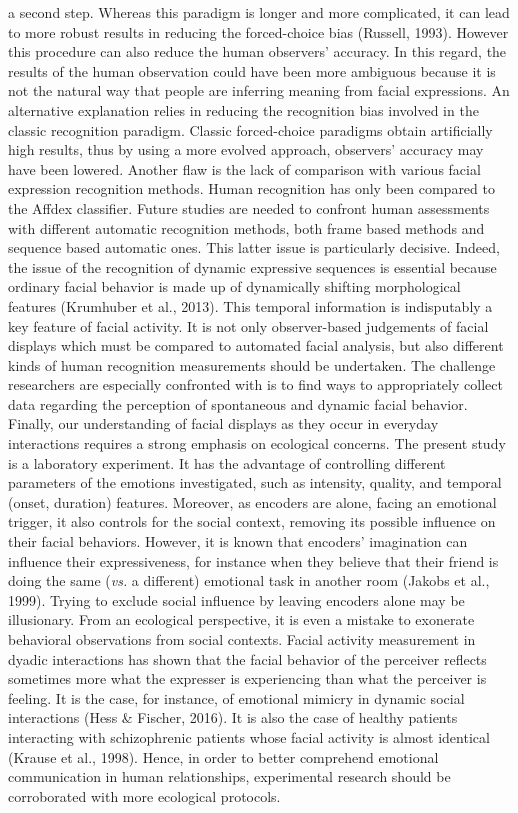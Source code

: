 \documentclass[
  english,
  doc]{apa7}
\begin{document}
a second step. Whereas this paradigm is longer and more complicated, it can lead to more robust results in reducing the forced-choice bias (Russell, 1993). However this procedure can also reduce the human observers' accuracy. In this regard, the results of the human observation could have been more ambiguous because it is not the natural way that people are inferring meaning from facial expressions. An alternative explanation relies in reducing the recognition bias involved in the classic recognition paradigm. Classic forced-choice paradigms obtain artificially high results, thus by using a more evolved approach, observers' accuracy may have been lowered. Another flaw is the lack of comparison with various facial expression recognition methods. Human recognition has only been compared to the Affdex classifier. Future studies are needed to confront human assessments with different automatic recognition methods, both frame based methods and sequence based automatic ones. This latter issue is particularly decisive. Indeed, the issue of the recognition of dynamic expressive sequences is essential because ordinary facial behavior is made up of dynamically shifting morphological features (Krumhuber et al., 2013). This temporal information is indisputably a key feature of facial activity. It is not only observer-based judgements of facial displays which must be compared to automated facial analysis, but also different kinds of human recognition measurements should be undertaken. The challenge researchers are especially confronted with is to find ways to appropriately collect data regarding the perception of spontaneous and dynamic facial behavior. Finally, our understanding of facial displays as they occur in everyday interactions requires a strong emphasis on ecological concerns. The present study is a laboratory experiment. It has the advantage of controlling different parameters of the emotions investigated, such as intensity, quality, and temporal (onset, duration) features. Moreover, as encoders are alone, facing an emotional trigger, it also controls for the social context, removing its possible influence on their facial behaviors. However, it is known that encoders' imagination can influence their expressiveness, for instance when they believe that their friend is doing the same (\emph{vs.} a different) emotional task in another room (Jakobs et al., 1999). Trying to exclude social influence by leaving encoders alone may be illusionary. From an ecological perspective, it is even a mistake to exonerate behavioral observations from social contexts. Facial activity measurement in dyadic interactions has shown that the facial behavior of the perceiver reflects sometimes more what the expresser is experiencing than what the perceiver is feeling. It is the case, for instance, of emotional mimicry in dynamic social interactions (Hess \& Fischer, 2016). It is also the case of healthy patients interacting with schizophrenic patients whose facial activity is almost identical (Krause et al., 1998). Hence, in order to better comprehend emotional communication in human relationships, experimental research should be corroborated with more ecological protocols.
\end{document}
